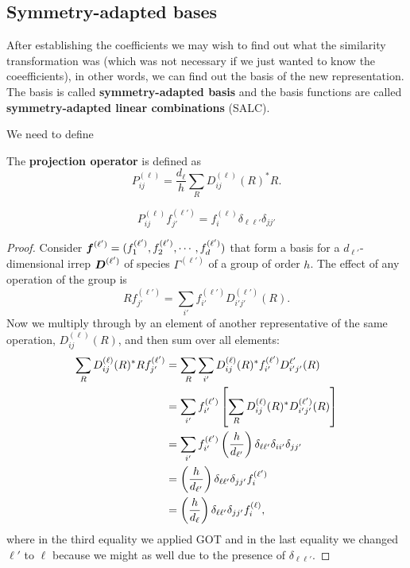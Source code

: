 \subsection{Symmetry-adapted bases}
After establishing the coefficients we may wish to find out what the similarity 
transformation was (which was not necessary if we just wanted to know the 
coeefficients), in other words, we can find out the basis of the new 
representation. The basis is called \textbf{symmetry-adapted basis} and the basis 
functions are called \textbf{symmetry-adapted linear combinations} (SALC). \par
We need to define
\begin{defi}
The \textbf{projection operator} is defined as 
\begin{equation}
P_{ij}^{(\ell)}=\frac{d_{\ell}}{h}\sum_RD_{ij}^{(\ell)}(R)^*R.
\end{equation}
\end{defi}
\begin{prt}
\begin{equation}
P_{ij}^{(\ell)}f_{j'}^{(\ell')}=f_i^{(\ell)}\delta_{\ell\ell'}\delta_{jj'}
\end{equation}
\end{prt}
\begin{proof}
Consider $\boldsymbol{f}^{(\ell')}=(f_1^{(\ell')},f_2^{(\ell')},\cdots,f_d^{(\ell')})$ 
that form a basis for a $d_{\ell'}$-dimensional irrep $\boldsymbol{D}^{(\ell')}$ of 
species $\Gamma^{(\ell')}$ of a group of order $h$. The effect of any operation 
of the group is 
\begin{equation}
Rf_{j'}^{(\ell')}=\sum_{i'}f_{i'}^{(\ell')}D_{i'j'}^{(\ell')}(R).
\end{equation}
Now we multiply through by an element of another representative of the same 
operation, $D_{ij}^{(\ell)}(R)$, and then sum over all elements:
\begin{equation}
\begin{aligned}
\sum_RD_{ij}^{(\ell)}(R)^*Rf_{j'}^{(\ell')}&=\sum_R\sum_{i'}D_{ij}^{(\ell)}(R)^*f_{i'}^{(\ell')}D_{i'j'}^{\ell'}(R)\\
&=\sum_{i'}f_{i'}^{(\ell')}\left[\sum_RD_{ij}^{(\ell)}(R)^*D_{i'j'}^{(\ell')}(R)\right]\\
&=\sum_{i'}f_{i'}^{(\ell')}\left(\frac{h}{d_{\ell'}} \right)\delta_{\ell\ell'}\delta_{ii'}\delta_{jj'}\\
&=\left(\frac{h}{d_{\ell'}} \right)\delta_{\ell\ell'}\delta_{jj'}f_i^{(\ell')}\\
&=\left(\frac{h}{d_{\ell}} \right)\delta_{\ell\ell'}\delta_{jj'}f_i^{(\ell)}, 
\end{aligned}
\end{equation}
where in the third equality we applied GOT and in the last equality we changed 
$\ell'$ to $\ell$ because we might as well due to the presence of 
$\delta_{\ell\ell'}$. 
\end{proof}
